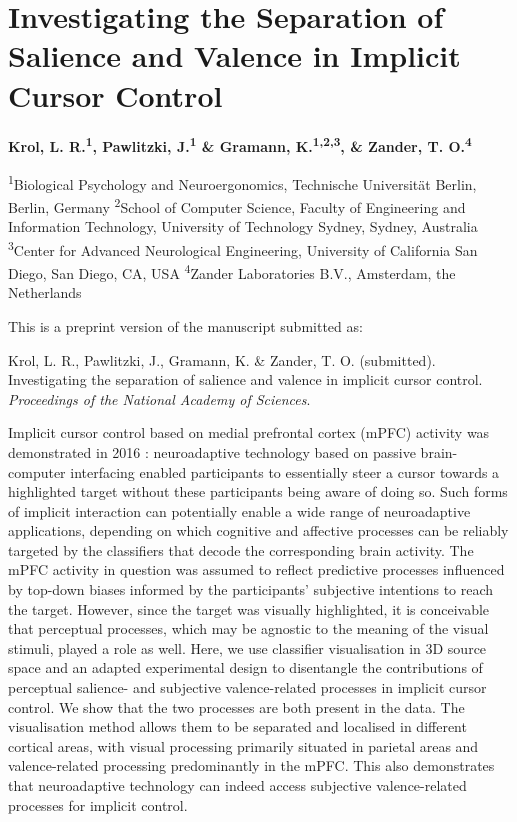 
\chapter{Investigating the Separation of Salience and Valence in Implicit Cursor Control}
%
\label{chapter:salval}%


{\chaptermeta 

\textbf{Krol, L. R.\textsuperscript{1}, Pawlitzki, J.\textsuperscript{1} \& Gramann, K.\textsuperscript{1,2,3}, \& Zander, T. O.\textsuperscript{4}}

{\small
\textsuperscript{1}Biological Psychology and Neuroergonomics, Technische Universität Berlin, Berlin, Germany
\textsuperscript{2}School of Computer Science, Faculty of Engineering and Information Technology, University of Technology Sydney, Sydney, Australia
\textsuperscript{3}Center for Advanced Neurological Engineering, University of California San Diego, San Diego, CA, USA
\textsuperscript{4}Zander Laboratories B.V., Amsterdam, the Netherlands

This is a preprint version of the manuscript submitted as:

Krol, L. R., Pawlitzki, J., Gramann, K. \& Zander, T. O. (submitted). Investigating the separation of salience and valence in implicit cursor control. \textit{Proceedings of the National Academy of Sciences}.
\par}}


\abstract%
Implicit cursor control based on medial prefrontal cortex (mPFC) activity was demonstrated in 2016 \cite{zander2016nat}: neuroadaptive technology based on passive brain-computer interfacing enabled participants to essentially steer a cursor towards a highlighted target without these participants being aware of doing so. Such forms of implicit interaction can potentially enable a wide range of neuroadaptive applications, depending on which cognitive and affective processes can be reliably targeted by the classifiers that decode the corresponding brain activity. The mPFC activity in question was assumed to reflect predictive processes influenced by top-down biases informed by the participants' subjective intentions to reach the target. However, since the target was visually highlighted, it is conceivable that perceptual processes, which may be agnostic to the meaning of the visual stimuli, played a role as well. Here, we use classifier visualisation in 3D source space and an adapted experimental design to disentangle the contributions of perceptual salience- and subjective valence-related processes in implicit cursor control. We show that the two processes are both present in the data. The visualisation method allows them to be separated and localised in different cortical areas, with visual processing primarily situated in parietal areas and valence-related processing predominantly in the mPFC. This also demonstrates that neuroadaptive technology can indeed access subjective valence-related processes for implicit control.


